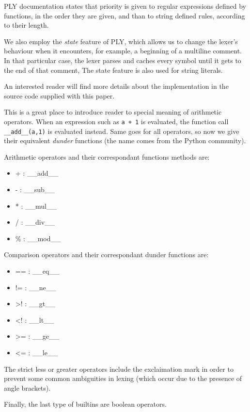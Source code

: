 \documentclass[times, utf8, diplomski]{fer}
\theoremstyle{definition}
\begin{document}
PLY documentation states that priority is given to regular expressions defined by functions, in the order they are given, and than to string defined rules, according to their length. 

We also employ the \textit{state} feature of PLY, 
which allows us to change the lexer's behaviour
when it encounters, for example, a beginning of a multiline comment. 
In that particular case, the lexer parses and caches every 
symbol until it gets to the end of that comment, 
The state feature is also used for string literals.

An interested reader will find more details about the implementation in
the source code supplied with this paper.

This is a great place to introduce reader to special meaning of arithmetic operators.
When an expression such as \texttt{a + 1} is evaluated, 
the function call \texttt{\_\_add\_\_(a,1)} is evaluated instead.
Same goes for all operators, so now we give their equivalent \textit{dunder} functions 
(the name comes from the Python community). 

Arithmetic operators and their correspondant functions methods are:

\begin{itemize}
    \item + : \_\_add\_\_
    \item - : \_\_sub\_\_
    \item * : \_\_mul\_\_
    \item / : \_\_div\_\_
    \item \% : \_\_mod\_\_
\end{itemize}

Comparison operators and their correspondant dunder functions are:

\begin{itemize}
    \item == : \_\_eq\_\_
    \item != : \_\_ne\_\_
    \item >! : \_\_gt\_\_
    \item <! : \_\_lt\_\_
    \item >= : \_\_ge\_\_
    \item <= : \_\_le\_\_
\end{itemize}

The strict less or greater operators include the exclaimation mark in order to
prevent some common ambiguities in lexing (which occur due to the presence of angle
brackets).

Finally, the last type of builtins are boolean operators.
\end{document}
